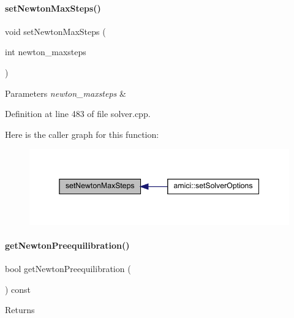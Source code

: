\paragraph{\texorpdfstring{set\+Newton\+Max\+Steps()}{setNewtonMaxSteps()}}
{\footnotesize\ttfamily void set\+Newton\+Max\+Steps (\begin{DoxyParamCaption}\item[{int}]{newton\+\_\+maxsteps }\end{DoxyParamCaption})}


\begin{DoxyParams}{Parameters}
{\em newton\+\_\+maxsteps} & \\
\hline
\end{DoxyParams}


Definition at line 483 of file solver.\+cpp.

Here is the caller graph for this function\+:
\nopagebreak
\begin{figure}[H]
\begin{center}
\leavevmode
\includegraphics[width=345pt]{classamici_1_1_solver_abf2e868e186c724c8ab939ba261ef314_icgraph}
\end{center}
\end{figure}
\mbox{\label{classamici_1_1_solver_a75aabe2e004edaba96db48b0abd3fc6f}} 
\paragraph{\texorpdfstring{get\+Newton\+Preequilibration()}{getNewtonPreequilibration()}}
{\footnotesize\ttfamily bool get\+Newton\+Preequilibration (\begin{DoxyParamCaption}{ }\end{DoxyParamCaption}) const}

\begin{DoxyReturn}{Returns}

\end{DoxyReturn}


